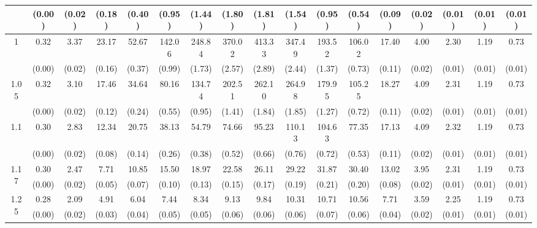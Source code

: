 \documentclass[12pt]{article}  %
\theoremstyle{plain}
\begin{document}
\begin{sidewaystable}[htbp]
\begin{tabular}{ccccccccccccccccc}
					  & (0.00)& (0.02)& (0.18)& (0.40)& (0.95)& (1.44)& (1.80)& (1.81)& (1.54)& (0.95)& (0.54)& (0.09)&  (0.02)& (0.01)& (0.01)& (0.01)\\ \hline
\multirow{2}{*}{1}  &  0.32 &3.37& 23.17& 52.67& 142.06& 248.84& 370.02 &413.33& 347.49 &193.52 &106.02& 17.40 &4.00 &2.30& 1.19& 0.73\\
                      & (0.00)& (0.02)& (0.16)& (0.37)& (0.99)& (1.73)& (2.57)& (2.89)& (2.44)& (1.37)& (0.73)& (0.11)&  (0.02) & (0.01)& (0.01)& (0.01)\\ \hline                                                                     
\multirow{2}{*}{1.05}  & 0.32 &3.10 &17.46& 34.64 & 80.16& 134.74& 202.51& 262.10 &264.98& 179.95 &105.25 &18.27 &4.09 &2.31& 1.19 &0.73\\
                      & (0.00)&   (0.02)& (0.12)& (0.24)& (0.55)& (0.95)& (1.41)& (1.84)& (1.85)& (1.27)& (0.72)& (0.11)&  (0.02)& (0.01)& (0.01)& (0.01)\\ \hline                                                                                                                                          
\multirow{2}{*}{1.1}  &0.30& 2.83& 12.34& 20.75 & 38.13 & 54.79 & 74.66 & 95.23& 110.13& 104.63 & 77.35& 17.13 &4.09& 2.32& 1.19& 0.73\\
                      &  (0.00)&   (0.02)& (0.08)& (0.14)& (0.26)& (0.38)& (0.52)& (0.66)& (0.76)& (0.72)& (0.53)& (0.11)&  (0.02)& (0.01)& (0.01)& (0.01)\\ \hline
\multirow{2}{*}{1.17}  & 0.30 &2.47 & 7.71& 10.85 & 15.50 & 18.97 & 22.58 & 26.11 & 29.22 & 31.87 & 30.40& 13.02& 3.95& 2.31& 1.19& 0.73\\
                      & (0.00)&   (0.02)& (0.05)& (0.07)& (0.10)& (0.13)& (0.15)& (0.17)& (0.19)& (0.21)& (0.20)& (0.08)&  (0.02)& (0.01)& (0.01)& (0.01)\\ \hline                                                                                                                                                                                                                                                                                    
                                                                     \multirow{2}{*}{1.25}  &0.28& 2.09 & 4.91 & 6.04 &  7.44 &  8.34  & 9.13  & 9.84 & 10.31 & 10.71 & 10.56 & 7.71 &3.59& 2.25& 1.19& 0.73\\
                       & (0.00)&   (0.02)& (0.03)& (0.04)& (0.05)& (0.05)& (0.06)& (0.06)& (0.06)& (0.07)& (0.06)& (0.04)&  (0.02)& (0.01)& (0.01)& (0.01)\\ \hline                                                                                                                                                                                                                                                                                    

\end{tabular}
\end{sidewaystable}
\end{document}
